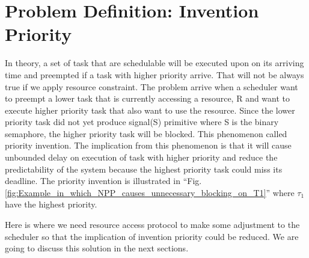 \section{Problem Definition: Invention Priority}

In theory, a set of task that are schedulable will be executed upon on its arriving time and preempted if a task with higher priority arrive. That will not be always true if we apply resource constraint. The problem arrive when a scheduler want to preempt a lower task that is currently accessing a  resource, R and want to execute higher priority task that also want to use the resource. Since the lower priority task did not yet produce signal(S) primitive where S is the binary semaphore, the higher priority task will be blocked. This phenomenon called priority invention. The implication from this phenomenon is that it will cause unbounded delay on execution of task with higher priority and reduce the predictability of the system because the highest priority task could miss its deadline. The priority invention is illustrated in ``Fig. \ref{fig:Example_in_which_NPP_causes_unnecessary_blocking_on_T1}'' where $ \tau_{1} $ have the highest priority.

Here is where we need resource access protocol to make some adjustment to the scheduler so that the implication of invention priority could be reduced. We are going to discuss this solution in the next sections.